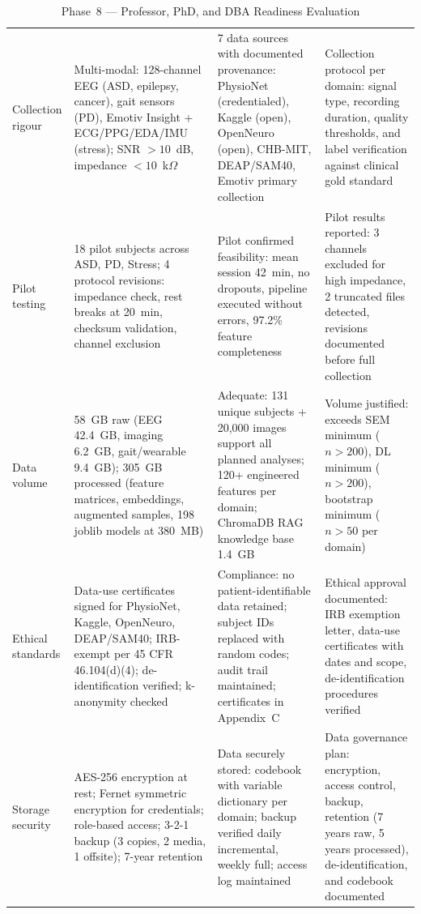 \begin{xltabular}{\textwidth}{@{} >{\raggedright\arraybackslash}p{0.14\textwidth} X X X @{}}
\caption{Phase~8 --- Professor, PhD, and DBA Readiness Evaluation}
\label{tab:phase8_readiness}\\
\toprule
{} &  &  &  \\
\midrule
\endfirsthead
\endhead
\bottomrule
\endlastfoot
Collection rigour     & Multi-modal: 128-channel EEG (ASD, epilepsy, cancer), gait sensors (PD), Emotiv Insight + ECG/PPG/EDA/IMU (stress); SNR $> 10$~dB, impedance $< 10$~k$\Omega$ & 7 data sources with documented provenance: PhysioNet (credentialed), Kaggle (open), OpenNeuro (open), CHB-MIT, DEAP/SAM40, Emotiv primary collection & Collection protocol per domain: signal type, recording duration, quality thresholds, and label verification against clinical gold standard \\
\addlinespace
Pilot testing         & 18 pilot subjects across ASD, PD, Stress; 4 protocol revisions: impedance check, rest breaks at 20~min, checksum validation, channel exclusion & Pilot confirmed feasibility: mean session 42~min, no dropouts, pipeline executed without errors, 97.2\% feature completeness & Pilot results reported: 3 channels excluded for high impedance, 2 truncated files detected, revisions documented before full collection \\
\addlinespace
Data volume           & 58~GB raw (EEG 42.4~GB, imaging 6.2~GB, gait/wearable 9.4~GB); 305~GB processed (feature matrices, embeddings, augmented samples, 198 joblib models at 380~MB) & Adequate: 131 unique subjects + 20{,}000 images support all planned analyses; 120+ engineered features per domain; ChromaDB RAG knowledge base 1.4~GB & Volume justified: exceeds SEM minimum ($n > 200$), DL minimum ($n > 200$), bootstrap minimum ($n > 50$ per domain) \\
\addlinespace
Ethical standards     & Data-use certificates signed for PhysioNet, Kaggle, OpenNeuro, DEAP/SAM40; IRB-exempt per 45 CFR 46.104(d)(4); de-identification verified; k-anonymity checked & Compliance: no patient-identifiable data retained; subject IDs replaced with random codes; audit trail maintained; certificates in Appendix~C & Ethical approval documented: IRB exemption letter, data-use certificates with dates and scope, de-identification procedures verified \\
\addlinespace
Storage security      & AES-256 encryption at rest; Fernet symmetric encryption for credentials; role-based access; 3-2-1 backup (3 copies, 2 media, 1 offsite); 7-year retention & Data securely stored: codebook with variable dictionary per domain; backup verified daily incremental, weekly full; access log maintained & Data governance plan: encryption, access control, backup, retention (7 years raw, 5 years processed), de-identification, and codebook documented \\

\end{xltabular}
